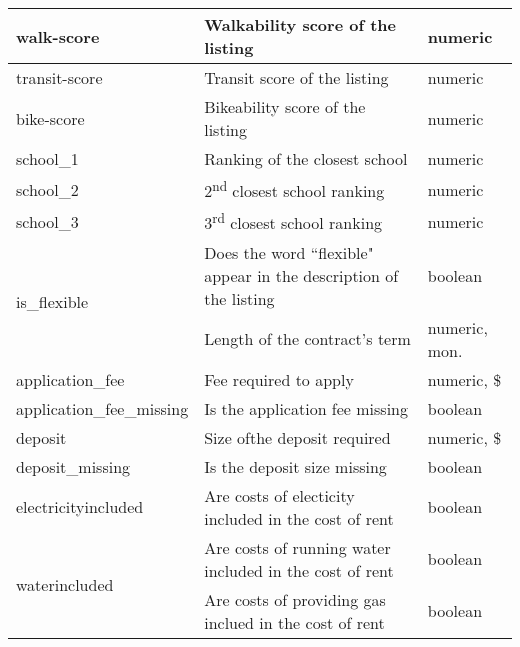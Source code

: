 \documentclass[12pt]{report}
\begin{document}
\begin{longtable}{|p{4cm}|p{8.7cm}|p{2.5cm}|}
	walk-score                         & Walkability score of the listing                                    & numeric          \\ \hline
	transit-score                      & Transit score of the listing                                        & numeric          \\ \hline
	bike-score                         & Bikeability score of the listing                                    & numeric          \\ \hline
	school\_1                          & Ranking of the closest school                                       & numeric          \\ \hline
	school\_2                          & 2\textsuperscript{nd} closest school ranking                        & numeric          \\ \hline
	school\_3                          & 3\textsuperscript{rd} closest school ranking                        & numeric          \\ \hline
	\multirow{2}{*}{is\_flexible}      & Does the word ``flexible" appear  in the description of the listing & boolean          \\ \hline
	lease\_term                        & Length of the contract's term                                       & numeric, mon.    \\ \hline
	application\_fee                   & Fee required to apply                                               & numeric, \$      \\ \hline
	application\_fee\_missing          & Is the application fee missing                                      & boolean          \\ \hline
	deposit                            & Size ofthe deposit required                                         & numeric, \$      \\ \hline
	deposit\_missing                   & Is the deposit size missing                                         & boolean          \\ \hline
	electricityincluded                & Are costs of electicity included in the cost of rent                & boolean          \\ \hline
	\multirow{2}{*}{waterincluded}     & Are costs of running water included in the cost of rent             & boolean          \\ \hline
	gasincluded                        & Are costs of providing gas  inclued in the cost of rent             & boolean          \\ \hline

\end{longtable}
\end{document}
